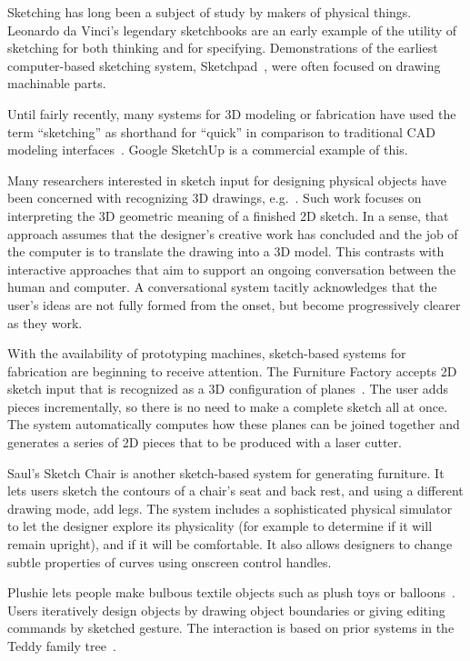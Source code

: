 \documentclass[12pt]{article}
\begin{document}
Sketching has long been a subject of study by makers of physical
things. Leonardo da Vinci's legendary sketchbooks are an early example
of the utility of sketching for both thinking and for
specifying. Demonstrations of the earliest computer-based sketching
system, Sketchpad~\cite{sutherland-sketchpad}, were often focused on
drawing machinable parts.

Until fairly recently, many systems for 3D modeling or fabrication
have used the term ``sketching'' as shorthand for ``quick'' in
comparison to traditional CAD modeling
interfaces~\cite{bloomenthal-sketch-n-make,pugh-thesis-viking,zeleznik-sketch}. Google
SketchUp is a commercial example of this.

Many researchers interested in sketch input for designing physical
objects have been concerned with recognizing 3D drawings,
e.g.~\cite{lipson-correlation,masry-3d-sketch}. Such work focuses on
interpreting the 3D geometric meaning of a finished 2D sketch. In a
sense, that approach assumes that the designer's creative work has
concluded and the job of the computer is to translate the drawing into
a 3D model. This contrasts with interactive approaches that aim to
support an ongoing conversation between the human and computer. A
conversational system tacitly acknowledges that the user's ideas are
not fully formed from the onset, but become progressively clearer as
they work.

With the availability of prototyping machines, sketch-based systems
for fabrication are beginning to receive attention. The Furniture
Factory accepts 2D sketch input that is recognized as a 3D
configuration of planes~\cite{oh-fab}. The user adds pieces
incrementally, so there is no need to make a complete sketch all at
once. The system automatically computes how these planes can be joined
together and generates a series of 2D pieces that to be produced with
a laser cutter.

Saul's Sketch Chair \cite{saul-sketch-chair} is another sketch-based
system for generating furniture. It lets users sketch the contours of
a chair's seat and back rest, and using a different drawing mode, add
legs. The system includes a sophisticated physical simulator to let
the designer explore its physicality (for example to determine if it
will remain upright), and if it will be comfortable. It also allows
designers to change subtle properties of curves using onscreen control
handles.

Plushie lets people make bulbous textile objects such as plush toys or
balloons~\cite{mori-plushie}. Users iteratively design objects by
drawing object boundaries or giving editing commands by sketched
gesture. The interaction is based on prior systems in the Teddy family
tree~\cite{igarashi-teddy}.
\end{document}
